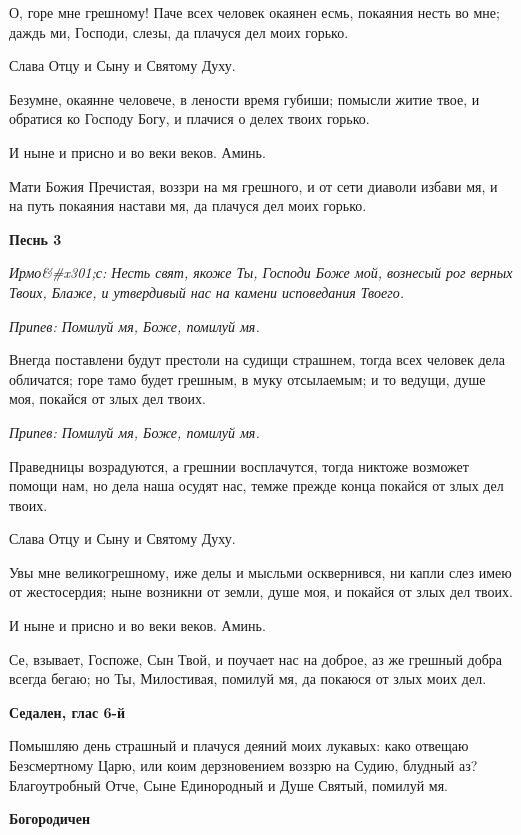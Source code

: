 О, горе мне грешному! Паче всех человек окаянен есмь, покаяния несть во мне; даждь ми, Господи, слезы, да плачуся дел моих горько.


Слава Отцу и Сыну и Святому Духу.


Безумне, окаянне человече, в лености время губиши; помысли житие твое, и обратися ко Господу Богу, и плачися о делех твоих горько.


И ныне и присно и во веки веков. Аминь.


Мати Божия Пречистая, воззри на мя грешного, и от сети диаволи избави мя, и на путь покаяния настави мя, да плачуся дел моих горько.




\bfseries Песнь 3\normalfont{}


\itshape Ирмо&#x301;с:\normalfont{} Несть свят, якоже Ты, Господи Боже мой, вознесый рог верных Твоих, Блаже, и утвердивый нас на камени исповедания Твоего.


\itshape Припев:\normalfont{} Помилуй мя, Боже, помилуй мя.


Внегда поставлени будут престоли на судищи страшнем, тогда всех человек дела обличатся; горе тамо будет грешным, в муку отсылаемым; и то ведущи, душе моя, покайся от злых дел твоих.


\itshape Припев:\normalfont{} Помилуй мя, Боже, помилуй мя.


Праведницы возрадуются, а грешнии восплачутся, тогда никтоже возможет помощи нам, но дела наша осудят нас, темже прежде конца покайся от злых дел твоих.


Слава Отцу и Сыну и Святому Духу.


Увы мне великогрешному, иже делы и мысльми осквернився, ни капли слез имею от жестосердия; ныне возникни от земли, душе моя, и покайся от злых дел твоих.


И ныне и присно и во веки веков. Аминь.


Се, взывает, Госпоже, Сын Твой, и поучает нас на доброе, аз же грешный добра всегда бегаю; но Ты, Милостивая, помилуй мя, да покаюся от злых моих дел.




\bfseries Седален, глас 6-й\normalfont{}


Помышляю день страшный и плачуся деяний моих лукавых: како отвещаю Безсмертному Царю, или коим дерзновением воззрю на Судию, блудный аз? Благоутробный Отче, Сыне Единородный и Душе Святый, помилуй мя.




\bfseries Богородичен\normalfont{}



